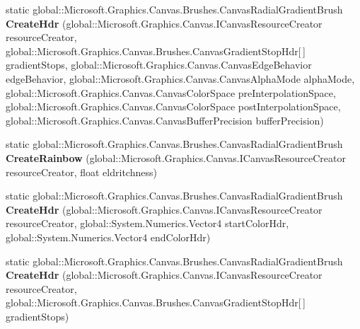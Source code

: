 \begin{DoxyCompactItemize}
\item 
\mbox{\label{class_microsoft_1_1_graphics_1_1_canvas_1_1_brushes_1_1_canvas_radial_gradient_brush_a51c1cc7d4745f7d2f3e322b078cc04cb}} 
static global\+::\+Microsoft.\+Graphics.\+Canvas.\+Brushes.\+Canvas\+Radial\+Gradient\+Brush {\bfseries Create\+Hdr} (global\+::\+Microsoft.\+Graphics.\+Canvas.\+I\+Canvas\+Resource\+Creator resource\+Creator, global\+::\+Microsoft.\+Graphics.\+Canvas.\+Brushes.\+Canvas\+Gradient\+Stop\+Hdr\mbox{[}$\,$\mbox{]} gradient\+Stops, global\+::\+Microsoft.\+Graphics.\+Canvas.\+Canvas\+Edge\+Behavior edge\+Behavior, global\+::\+Microsoft.\+Graphics.\+Canvas.\+Canvas\+Alpha\+Mode alpha\+Mode, global\+::\+Microsoft.\+Graphics.\+Canvas.\+Canvas\+Color\+Space pre\+Interpolation\+Space, global\+::\+Microsoft.\+Graphics.\+Canvas.\+Canvas\+Color\+Space post\+Interpolation\+Space, global\+::\+Microsoft.\+Graphics.\+Canvas.\+Canvas\+Buffer\+Precision buffer\+Precision)
\item 
\mbox{\label{class_microsoft_1_1_graphics_1_1_canvas_1_1_brushes_1_1_canvas_radial_gradient_brush_a19932ca8ae9416ca37a762c1184257db}} 
static global\+::\+Microsoft.\+Graphics.\+Canvas.\+Brushes.\+Canvas\+Radial\+Gradient\+Brush {\bfseries Create\+Rainbow} (global\+::\+Microsoft.\+Graphics.\+Canvas.\+I\+Canvas\+Resource\+Creator resource\+Creator, float eldritchness)
\item 
\mbox{\label{class_microsoft_1_1_graphics_1_1_canvas_1_1_brushes_1_1_canvas_radial_gradient_brush_a9fc3b8b39e6337c070642178c6fb106c}} 
static global\+::\+Microsoft.\+Graphics.\+Canvas.\+Brushes.\+Canvas\+Radial\+Gradient\+Brush {\bfseries Create\+Hdr} (global\+::\+Microsoft.\+Graphics.\+Canvas.\+I\+Canvas\+Resource\+Creator resource\+Creator, global\+::\+System.\+Numerics.\+Vector4 start\+Color\+Hdr, global\+::\+System.\+Numerics.\+Vector4 end\+Color\+Hdr)
\item 
\mbox{\label{class_microsoft_1_1_graphics_1_1_canvas_1_1_brushes_1_1_canvas_radial_gradient_brush_aef0da396142c3d6724253585940535e0}} 
static global\+::\+Microsoft.\+Graphics.\+Canvas.\+Brushes.\+Canvas\+Radial\+Gradient\+Brush {\bfseries Create\+Hdr} (global\+::\+Microsoft.\+Graphics.\+Canvas.\+I\+Canvas\+Resource\+Creator resource\+Creator, global\+::\+Microsoft.\+Graphics.\+Canvas.\+Brushes.\+Canvas\+Gradient\+Stop\+Hdr\mbox{[}$\,$\mbox{]} gradient\+Stops)

\end{DoxyCompactItemize}
